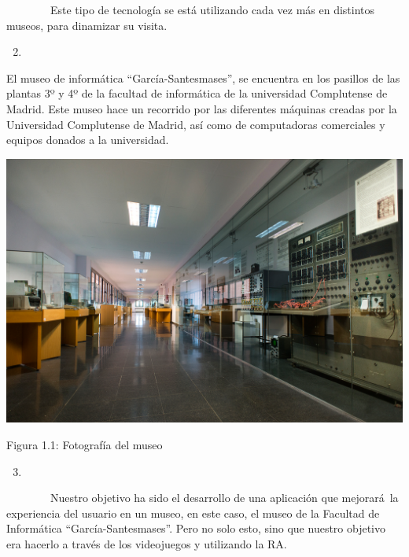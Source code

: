 \documentclass[]{article}
\begin{document}
~~~~~~~~Este tipo de tecnología se está utilizando cada vez más en
distintos museos, para dinamizar su visita.

\begin{enumerate}
\setcounter{enumi}{1}
\item
\end{enumerate}

El museo de informática ``García-Santesmases'', se encuentra en los
pasillos de las plantas 3º y 4º de la facultad de informática de la
universidad Complutense de Madrid. Este museo hace un recorrido por las
diferentes máquinas creadas por la Universidad Complutense de Madrid,
así como de computadoras comerciales y equipos donados a la universidad.

\includegraphics{images/image08.png}

Figura 1.1: Fotografía del museo

\begin{enumerate}
\setcounter{enumi}{2}
\item
\end{enumerate}

~~~~~~~~Nuestro objetivo ha sido el desarrollo de una aplicación que
mejorará~la experiencia del usuario en un museo, en este caso, el museo
de la Facultad de Informática ``García-Santesmases''. Pero no solo esto,
sino que nuestro objetivo era hacerlo a través de los videojuegos y
utilizando la RA.
\end{document}
